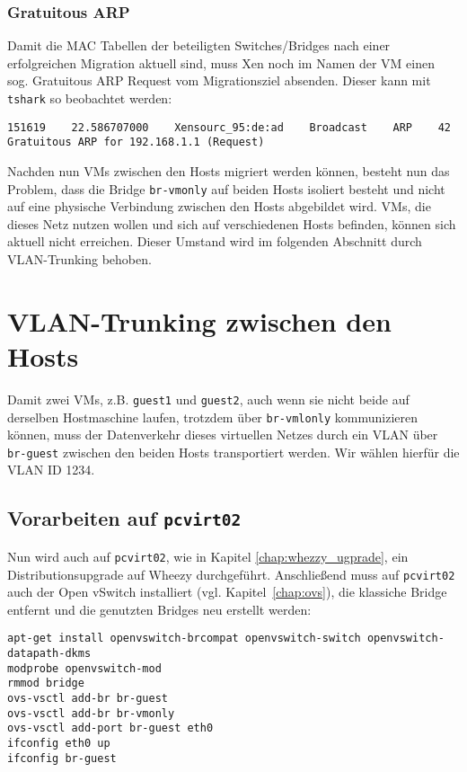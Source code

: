\subsection{Gratuitous ARP}
\label{Gratuitous}

Damit die MAC Tabellen der beteiligten Switches/Bridges nach einer erfolgreichen Migration aktuell sind, muss Xen noch im Namen der VM einen sog. Gratuitous ARP Request vom Migrationsziel absenden. Dieser kann mit \verb#tshark# so beobachtet werden:

\setupVerbatimOut
\begin{verbatim}
151619    22.586707000    Xensourc_95:de:ad    Broadcast    ARP    42    Gratuitous ARP for 192.168.1.1 (Request)
\end{verbatim}

Nachden nun VMs zwischen den Hosts migriert werden können, besteht nun das Problem, dass die Bridge \verb#br-vmonly# auf beiden Hosts isoliert besteht und nicht auf eine physische Verbindung zwischen den Hosts abgebildet wird. VMs, die dieses Netz nutzen wollen und sich auf verschiedenen Hosts befinden, können sich aktuell nicht erreichen. Dieser Umstand wird im folgenden Abschnitt durch VLAN-Trunking behoben.

\chapter{VLAN-Trunking zwischen den Hosts}
\label{vlan_trunk}
Damit zwei VMs, z.B. \verb#guest1# und \verb#guest2#, auch wenn sie nicht beide auf derselben Hostmaschine laufen, trotzdem über \verb#br-vmlonly# kommunizieren können, muss der Datenverkehr dieses virtuellen Netzes durch ein VLAN über \verb#br-guest# zwischen den beiden Hosts transportiert werden. Wir wählen hierfür die VLAN ID 1234.

\section {Vorarbeiten auf  \texttt{pcvirt02}}\label{ovs2}
Nun wird auch auf \verb#pcvirt02#, wie in Kapitel \ref{chap:whezzy_ugprade}, ein Distributionsupgrade auf Wheezy durchgeführt. Anschließend muss auf \verb#pcvirt02#  auch der Open vSwitch installiert (vgl. Kapitel~\ref{chap:ovs}), die klassiche Bridge entfernt und die genutzten Bridges neu erstellt werden:
\begin{verbatim}
apt-get install openvswitch-brcompat openvswitch-switch openvswitch-datapath-dkms
modprobe openvswitch-mod
rmmod bridge
ovs-vsctl add-br br-guest
ovs-vsctl add-br br-vmonly
ovs-vsctl add-port br-guest eth0
ifconfig eth0 up
ifconfig br-guest
\end{verbatim}

